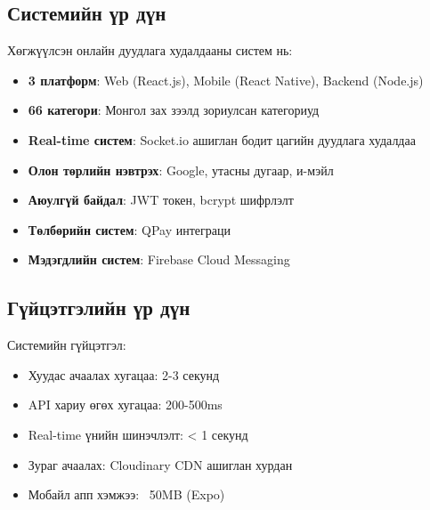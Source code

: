 \subsection{Системийн үр дүн}
Хөгжүүлсэн онлайн дуудлага худалдааны систем нь:
\begin{itemize}
\item \textbf{3 платформ}: Web (React.js), Mobile (React Native), Backend (Node.js)
\item \textbf{66 категори}: Монгол зах зээлд зориулсан категориуд
\item \textbf{Real-time систем}: Socket.io ашиглан бодит цагийн дуудлага худалдаа
\item \textbf{Олон төрлийн нэвтрэх}: Google, утасны дугаар, и-мэйл
\item \textbf{Аюулгүй байдал}: JWT токен, bcrypt шифрлэлт
\item \textbf{Төлбөрийн систем}: QPay интеграци
\item \textbf{Мэдэгдлийн систем}: Firebase Cloud Messaging
\end{itemize}

\subsection{Гүйцэтгэлийн үр дүн}
Системийн гүйцэтгэл:
\begin{itemize}
\item Хуудас ачаалах хугацаа: 2-3 секунд
\item API хариу өгөх хугацаа: 200-500ms
\item Real-time үнийн шинэчлэлт: < 1 секунд
\item Зураг ачаалах: Cloudinary CDN ашиглан хурдан
\item Мобайл апп хэмжээ: ~50MB (Expo)
\end{itemize}

\clearpage